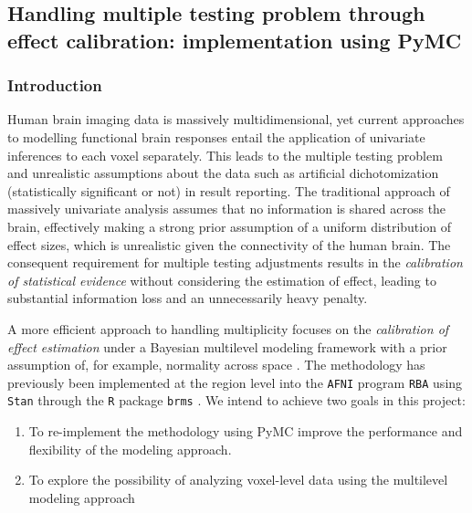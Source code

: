 \documentclass[../main.tex]{subfiles}
\begin{document}
\subsection{Handling multiple testing problem through effect calibration: implementation using PyMC}


\subsubsection{Introduction}

Human brain imaging data is massively multidimensional, yet current approaches to modelling functional brain responses entail the application of univariate inferences to each voxel separately. This leads to the multiple testing problem and unrealistic assumptions about the data such as artificial dichotomization (statistically significant or not) in result reporting. The traditional approach of massively univariate analysis assumes that no information is shared across the brain, effectively making a strong prior assumption of a uniform distribution of effect sizes, which is unrealistic given the connectivity of the human brain. The consequent requirement for multiple testing adjustments results in the \textit{calibration of statistical evidence} without considering the estimation of effect, leading to substantial information loss and an unnecessarily heavy penalty.

A more efficient approach to handling multiplicity focuses on the \textit{calibration of effect estimation} under a Bayesian multilevel modeling framework with a prior assumption of, for example, normality across space \parencite{chenHandlingMultiplicityNeuroimaging2019}. The methodology has previously been implemented at the region level into the \texttt{AFNI} program \texttt{RBA} \parencite{chen_sources_2022} using \texttt{Stan} through the \texttt{R} package \texttt{brms} \parencite{burknerBrmsPackageBayesian2017}. We intend to achieve two goals in this project: 
\begin{enumerate}[label=(\roman*),nolistsep]
    \item To re-implement the methodology using PyMC improve the performance and flexibility of the modeling approach.
    \item To explore the possibility of analyzing voxel-level data using the multilevel modeling approach
\end{enumerate}
\end{document}
